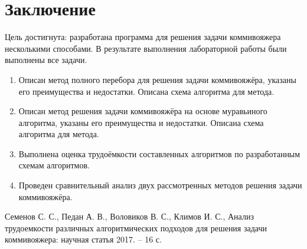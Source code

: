 \documentclass[12pt, a4paper]{article}
\begin{document}
\section*{Заключение}
Цель достигнута: разработана программа для решения задачи коммивояжера 
несколькими способами.
В результате выполнения лабораторной работы были выполнены все задачи.
\begin{enumerate}
	\item Описан метод полного перебора для решения 
задачи коммивояжёра, указаны его преимущества и 
недостатки. Описана схема алгоритма для метода.

\item Описан метод решения задачи коммивояжёра на 
основе муравьиного алгоритма, указаны его 
преимущества и недостатки. Описана схема алгоритма 
для метода.

\item Выполнена оценка трудоёмкости составленных 
алгоритмов по разработанным схемам алгоритмов.

\item Проведен сравнительный анализ двух 
рассмотренных методов решения задачи коммивояжёра.
\end{enumerate}
\newpage
\begin{center}
\begin{thebibliography}{}
Семенов С. С., Педан А. В., Воловиков В. С., Климов И. 
С., Анализ трудоемкости различных алгоритмических подходов
для решения задачи коммивояжера: научная статья 2017. – 16 с.
\end{thebibliography}
\end{center}
\end{document}
